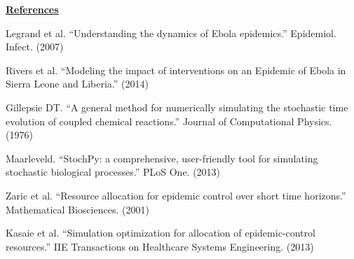\documentclass[11pt,letter]{article}
\begin{document}
\underline{\textbf{References}}\vspace{0.5mm}
\begin{enumerate}[ {[}1{]} ]
\item{Legrand et al. ``Understanding the dynamics of Ebola epidemics.'' Epidemiol. Infect. (2007)}
\item{Rivers et al. ``Modeling the impact of interventions on an Epidemic of Ebola in Sierra Leone and Liberia.'' (2014)}
\item{Gillepsie DT. ``A general method for numerically simulating the stochastic time evolution of coupled chemical reactions.'' Journal of Computational Physics. (1976)}
\item{Maarleveld. ``StochPy: a comprehensive, user-friendly tool for simulating stochastic biological processes.'' PLoS One. (2013)}
\item{Zaric et al. ``Resource allocation for epidemic control over short time horizons.'' Mathematical Biosciences. (2001)}
\item{Kasaie et al. ``Simulation optimization for allocation of epidemic-control resources.'' IIE Transactions on Healthcare Systems Engineering. (2013)}
\end{enumerate}
\end{document}

